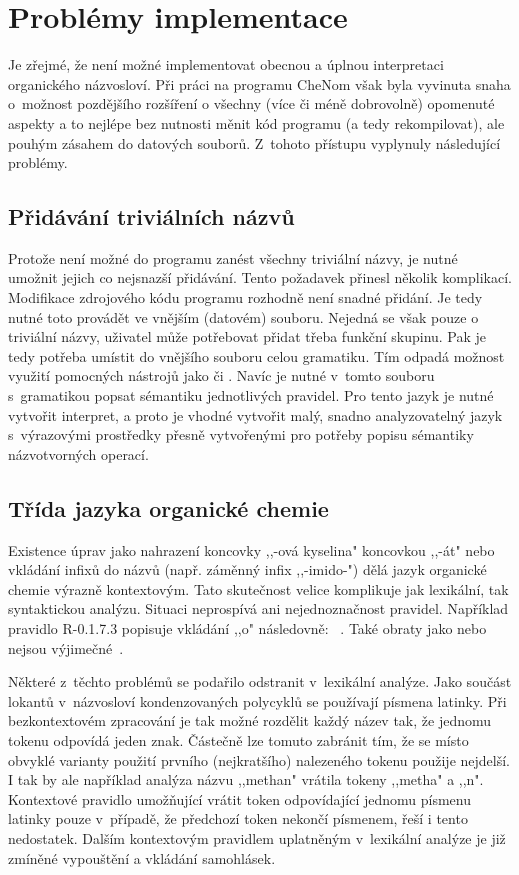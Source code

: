 \chapter{Problémy implementace}
Je zřejmé, že není možné implementovat obecnou a úplnou interpretaci organického
názvosloví. Při práci na programu CheNom však byla vyvinuta snaha o~možnost
pozdějšího rozšíření o všechny (více či méně dobrovolně) opomenuté aspekty a to
nejlépe bez nutnosti měnit kód programu (a tedy rekompilovat), ale pouhým
zásahem do datových souborů. Z~tohoto přístupu vyplynuly následující problémy.

\section{Přidávání triviálních názvů}
Protože není možné do programu zanést všechny triviální názvy, je nutné umožnit
jejich co nejsnazší přidávání. Tento požadavek přinesl několik komplikací.
Modifikace zdrojového kódu programu rozhodně není snadné přidání. Je tedy nutné
toto provádět ve vnějším (datovém) souboru. Nejedná se však pouze o triviální
názvy, uživatel může potřebovat přidat třeba funkční skupinu. Pak je tedy
potřeba umístit do vnějšího souboru celou gramatiku. Tím odpadá možnost využití
pomocných nástrojů jako  či . Navíc je nutné v~tomto souboru
s~gramatikou popsat sémantiku jednotlivých pravidel. Pro tento jazyk je nutné
vytvořit interpret, a proto je vhodné vytvořit malý, snadno analyzovatelný
jazyk s~výrazovými prostředky přesně vytvořenými pro potřeby popisu sémantiky
názvotvorných operací.

\section{Třída jazyka organické chemie}
Existence úprav jako nahrazení koncovky ,,-ová kyselina" koncovkou ,,-át" nebo
vkládání infixů do názvů (např. záměnný infix ,,-imido-") dělá jazyk organické
chemie výrazně kontextovým. Tato skutečnost velice komplikuje jak lexikální, tak
syntaktickou analýzu. Situaci neprospívá ani nejednoznačnost pravidel. Například
pravidlo R-0.1.7.3 popisuje vkládání ,,o" následovně: ~\cite{Kahovec:modrakniha}. Také obraty jako  nebo
 nejsou
výjimečné~\cite{Kahovec:modrakniha}.

Některé z~těchto problémů se podařilo odstranit v~lexikální analýze. Jako součást
lokantů v~názvosloví kondenzovaných polycyklů se používají písmena latinky. Při
bezkontextovém zpracování je tak možné rozdělit každý název tak, že jednomu
tokenu odpovídá jeden znak. Částečně lze tomuto zabránit tím, že se místo
obvyklé varianty použití prvního (nejkratšího) nalezeného tokenu použije
nejdelší. I tak by ale například analýza názvu ,,methan" vrátila tokeny ,,metha"
a ,,n". Kontextové pravidlo umožňující vrátit token odpovídající jednomu písmenu
latinky pouze v~případě, že předchozí token nekončí písmenem, řeší i tento
nedostatek. Dalším kontextovým pravidlem uplatněným v~lexikální analýze je již
zmíněné vypouštění a vkládání samohlásek.

